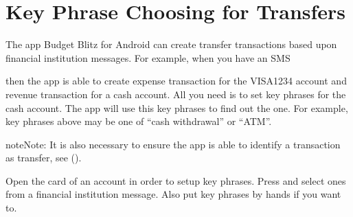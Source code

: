 \documentclass[a4paper,10pt,english]{sphinxmanual}
\begin{document}
\noindent{}

\noindent{}

\noindent{}

\noindent{}

\noindent{}


\section{Key Phrase Choosing for Transfers}
\label{\detokenize{account-identities:key-phrase-choosing-for-transfers}}
\sphinxAtStartPar
The app Budget Blitz for Android can create transfer transactions based upon financial institution messages. For example, when you
have an SMS

\begin{sphinxVerbatim}[commandchars=\\\{\}]
           
\end{sphinxVerbatim}

\sphinxAtStartPar
then the app is able to create expense transaction for the VISA1234 account and revenue transaction
for a cash account. All you need is to set key phrases for the cash account. The app will
use this key phrases to find out the one. For example, key phrases above may be one of “cash withdrawal” or
“ATM”.

\begin{sphinxadmonition}{note}{Note:}
\sphinxAtStartPar
It is also necessary to ensure the app is able to identify a transaction as transfer, see {\hyperref[\detokenize{notifications:chapter-notifications}]{}} ().
\end{sphinxadmonition}

\sphinxAtStartPar
Open the card of an account in order to setup key phrases. Press  and
select ones from a financial institution message. Also put key phrases by hands
if you want to.
\end{document}
